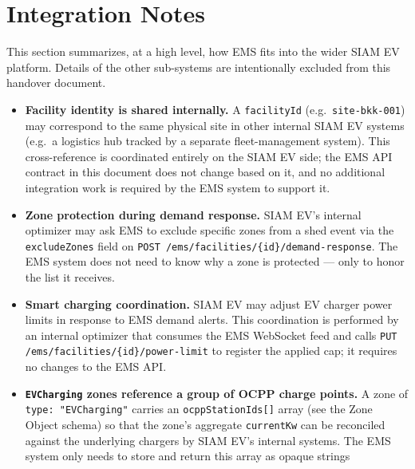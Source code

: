 \documentclass{article}
\begin{document}
\newpage

\section{Integration Notes}
\label{sec:integration-notes}

This section summarizes, at a high level, how EMS fits into the wider SIAM EV
platform. Details of the other sub-systems are intentionally excluded from
this handover document.

\begin{itemize}[leftmargin=*]
    \item \textbf{Facility identity is shared internally.} A \texttt{facilityId}
          (e.g.\ \texttt{site-bkk-001}) may correspond to the same physical site
          in other internal SIAM EV systems (e.g.\ a logistics hub tracked by a
          separate fleet-management system). This cross-reference is coordinated
          entirely on the SIAM EV side; the EMS API contract in this document
          does not change based on it, and no additional integration work is
          required by the EMS system to support it.
    \item \textbf{Zone protection during demand response.} SIAM EV's internal
          optimizer may ask EMS to exclude specific zones from a shed event via
          the \texttt{excludeZones} field on \texttt{POST
          /ems/facilities/\{id\}/demand-response}. The EMS system does not need
          to know why a zone is protected --- only to honor the list it receives.
    \item \textbf{Smart charging coordination.} SIAM EV may adjust EV charger
          power limits in response to EMS demand alerts. This coordination is
          performed by an internal optimizer that consumes the EMS WebSocket
          feed and calls \texttt{PUT /ems/facilities/\{id\}/power-limit} to
          register the applied cap; it requires no changes to the EMS API.
    \item \textbf{\texttt{EVCharging} zones reference a group of OCPP charge
          points.} A zone of \texttt{type: "EVCharging"} carries an
          \texttt{ocppStationIds[]} array (see the Zone Object schema) so that
          the zone's aggregate \texttt{currentKw} can be reconciled against
          the underlying chargers by SIAM EV's internal systems. The EMS
          system only needs to store and return this array as opaque strings

\end{itemize}
\end{document}
